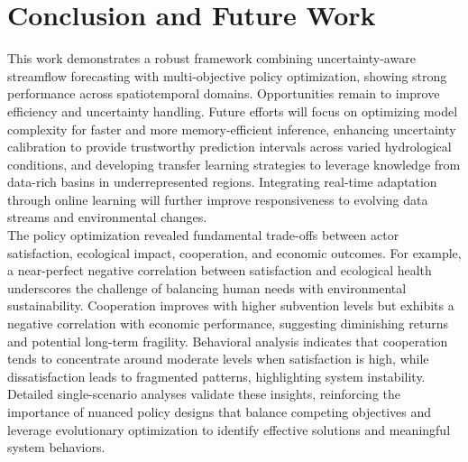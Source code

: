 \documentclass[ruler]{CUP-JNL-EDS}%
\begin{document}
\section{Conclusion and Future Work}
This work demonstrates a robust framework combining uncertainty-aware streamflow forecasting 
with multi-objective policy optimization, showing strong performance across spatiotemporal 
domains. Opportunities remain to improve efficiency and uncertainty handling. Future efforts 
will focus on optimizing model complexity for faster and more memory-efficient inference, 
enhancing uncertainty calibration to provide trustworthy prediction intervals across varied 
hydrological conditions, and developing transfer learning strategies to leverage knowledge 
from data-rich basins in underrepresented regions. Integrating real-time adaptation through 
online learning will further improve responsiveness to evolving data streams and environmental 
changes.\\

The policy optimization revealed fundamental trade-offs between actor satisfaction, ecological 
impact, cooperation, and economic outcomes. For example, a near-perfect negative correlation 
between satisfaction and ecological health underscores the challenge of balancing human needs 
with environmental sustainability. Cooperation improves with higher subvention levels but exhibits 
a negative correlation with economic performance, suggesting diminishing returns and potential 
long-term fragility. Behavioral analysis indicates that cooperation tends to concentrate around 
moderate levels when satisfaction is high, while dissatisfaction leads to fragmented patterns, 
highlighting system instability. Detailed single-scenario analyses validate these insights, 
reinforcing the importance of nuanced policy designs that balance competing objectives and 
leverage evolutionary optimization to identify effective solutions and meaningful system behaviors.
\end{document}
